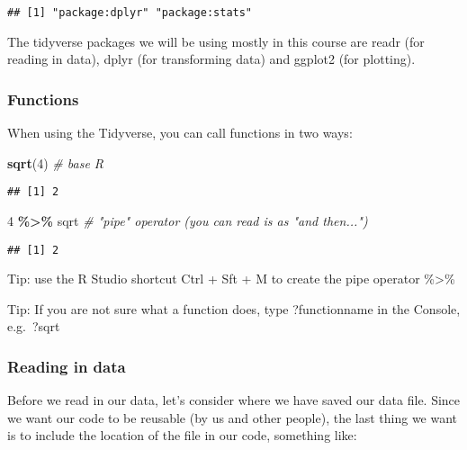 \documentclass[
]{article}
\newenvironment{Shaded}{\begin{snugshade}}{\end{snugshade}}
\newcommand{\CommentTok}[1]{\textcolor[rgb]{0.56,0.35,0.01}{\textit{#1}}}
\newcommand{\DecValTok}[1]{\textcolor[rgb]{0.00,0.00,0.81}{#1}}
\newcommand{\FunctionTok}[1]{\textcolor[rgb]{0.13,0.29,0.53}{\textbf{#1}}}
\newcommand{\NormalTok}[1]{#1}
\newcommand{\SpecialCharTok}[1]{\textcolor[rgb]{0.81,0.36,0.00}{\textbf{#1}}}
\begin{document}
\begin{verbatim}
## [1] "package:dplyr" "package:stats"
\end{verbatim}

The tidyverse packages we will be using mostly in this course are readr
(for reading in data), dplyr (for transforming data) and ggplot2 (for
plotting).

\subsubsection{Functions}\label{functions}

When using the Tidyverse, you can call functions in two ways:

\begin{Shaded}
\begin{Highlighting}[]
\FunctionTok{sqrt}\NormalTok{(}\DecValTok{4}\NormalTok{) }\CommentTok{\# base R}
\end{Highlighting}
\end{Shaded}

\begin{verbatim}
## [1] 2
\end{verbatim}

\begin{Shaded}
\begin{Highlighting}[]
\DecValTok{4} \SpecialCharTok{\%\textgreater{}\%}
\NormalTok{  sqrt  }\CommentTok{\# "pipe" operator (you can read is as "and then...")}
\end{Highlighting}
\end{Shaded}

\begin{verbatim}
## [1] 2
\end{verbatim}

Tip: use the R Studio shortcut Ctrl + Sft + M to create the pipe
operator \%\textgreater\%

Tip: If you are not sure what a function does, type ?functionname in the
Console, e.g.~?sqrt

\subsubsection{Reading in data}\label{reading-in-data}

Before we read in our data, let's consider where we have saved our data
file. Since we want our code to be reusable (by us and other people),
the last thing we want is to include the location of the file in our
code, something like:
\end{document}
